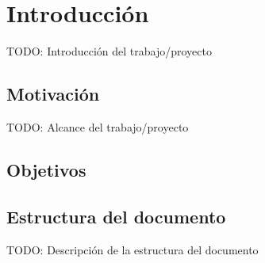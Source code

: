 \chapter{Introducción}

TODO: Introducción del trabajo/proyecto

\section{Motivación}

TODO: Alcance del trabajo/proyecto

\section{Objetivos}

\section{Estructura del documento}

TODO: Descripción de la estructura del documento
